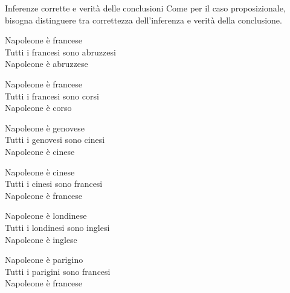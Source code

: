 \documentclass[aspectratio=169,10pt,dvipsnames,handout]{beamer}
\begin{document}
\begin{frame}{Inferenze corrette e verità delle conclusioni}
	Come per il caso proposizionale, bisogna distinguere tra correttezza dell'inferenza e verità della conclusione.
	\begin{center}
		\begin{inference}
			Napoleone è francese \only<2->{\rlap\checkmark}\\
			Tutti i francesi sono abruzzesi \only<2->{\rlap\xmark}\\
			\hline
			Napoleone è abruzzese \only<2->{\rlap\xmark}
		\end{inference}
		\qquad
		\begin{inference}
			Napoleone è francese \only<2->{\rlap\checkmark}\\
			Tutti i francesi sono corsi \only<2->{\rlap\xmark}\\
			\hline
			Napoleone è corso \only<2->{\rlap\checkmark}
		\end{inference}

		\medskip
		\begin{inference}
			Napoleone è genovese \only<3->{\rlap\xmark}\\
			Tutti i genovesi sono cinesi \only<3->{\rlap\xmark}\\
			\hline
			Napoleone è cinese \only<3->{\rlap\xmark}
		\end{inference}
		\qquad
		\begin{inference}
			Napoleone è cinese \only<3->{\rlap\xmark}\\
			Tutti i cinesi sono francesi \only<3->{\rlap\xmark}\\
			\hline
			Napoleone è francese \only<3->{\rlap\checkmark}
		\end{inference}

		\medskip
		\begin{inference}
			Napoleone è londinese \only<4->{\rlap\xmark}\\
			Tutti i londinesi sono inglesi \only<4->{\rlap\checkmark}\\
			\hline
			Napoleone è inglese \only<4->{\rlap\xmark}
		\end{inference}
		\qquad
		\begin{inference}
			Napoleone è parigino \only<4->{\rlap\xmark} \\
			Tutti i parigini sono francesi \only<4->{\rlap\checkmark}\\
			\hline
			Napoleone è francese \only<4->{\rlap\checkmark}
		\end{inference}


\end{center}
\end{frame}
\end{document}
